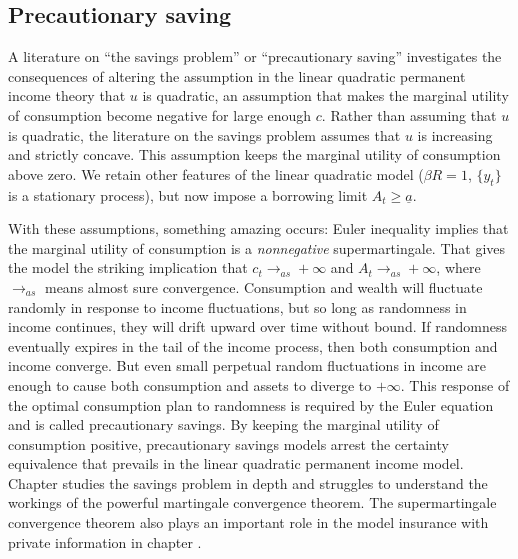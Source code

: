 \subsection{Precautionary saving}\label{sec:intro_precautionary}%
A literature on ``the  savings problem'' or ``precautionary saving''
investigates the consequences of altering the assumption in the
linear quadratic permanent income theory that $u$
is quadratic, an assumption that makes   the marginal utility of consumption
become  negative for large enough $c$. Rather than assuming that
$u$ is quadratic, the literature on the savings problem
assumes that $u$ is increasing and strictly
concave.  This assumption keeps the marginal utility of
consumption above zero.   We retain other features of the
linear quadratic model ($\beta R=1$, $\{y_t\}$ is a stationary
process), but now impose a borrowing limit $A_t \geq \underline
a$.

With these assumptions, something amazing occurs:   Euler
inequality  implies that the marginal  utility of
consumption is a {\it nonnegative\/}
supermartingale. That gives the
model the striking implication that $c_t \rightarrow_{as} +\infty$
and $A_t \rightarrow_{as} +\infty$, where $\rightarrow_{as}$ means
almost sure convergence. Consumption and wealth will fluctuate
randomly in response to income fluctuations, but so long as
randomness in income continues,
 they will drift upward over time without bound.
  If
randomness eventually expires in the tail of the income
 process, then both consumption
and income  converge.  But even
small perpetual random fluctuations
in income are enough to cause both consumption and assets to diverge
to $+\infty$.   This  response
of the optimal consumption
plan to randomness is required by the Euler equation  and
is called precautionary savings.
By keeping the marginal utility of consumption positive,
precautionary savings models arrest the  certainty equivalence  that prevails
in the linear quadratic permanent income model.
Chapter  studies the savings problem in depth and struggles
to understand the workings of the powerful martingale convergence theorem.
The supermartingale convergence theorem also plays an important role in the model
insurance with private information in chapter .

